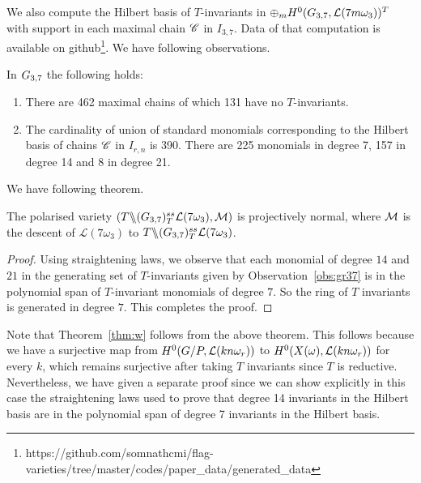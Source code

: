 We also compute the Hilbert basis of $T$-invariants in $\oplus_m H^0(G_{{3},{7}}, {\cal L}(7m\omega_3))^T$ with support in each maximal chain $\mathscr{C}$ in $I_{3,7}$.
Data of that computation is available on github\footnote{https://github.com/somnathcmi/flag-varieties/tree/master/codes/paper\_data/generated\_data}. We have following observations. 
\begin{observation}
\label{obs:gr37}
In $G_{{3},{7}}$ the following holds:
\begin{enumerate}
\item There are 462 maximal chains of which 131 have no $T$-invariants.
\item The cardinality of union of standard monomials corresponding to the Hilbert basis of chains $\mathscr{C}$ in $I_{r,n}$ is 390. There are 225 monomials in degree 7, 157 in degree 14 and 8 in degree 21.
\end{enumerate}
\end{observation}
  We have following theorem. 
\begin{theorem}
    The polarised variety \((T \backslash\mkern-6mu\backslash (G_{{3},{7}})^{ss}_T{\cal L}(7\omega_3),{\cal M})\) is projectively normal, where \(\cal M\) is the descent of \({\mathcal L}(7\omega_3)\) to \(T \backslash\mkern-6mu\backslash (G_{{3},{7}})^{ss}_T{\cal L}(7\omega_3)\).
\end{theorem}
\begin{proof}
Using straightening laws, we observe that each monomial of degree \(14\) and \(21\) in the generating set of $T$-invariants given by Observation~\ref{obs:gr37} is in the polynomial span of  $T$-invariant monomials  of degree \(7\). So the ring of $T$ invariants is generated in degree $7$. This completes the proof.
\end{proof}

Note that Theorem~\ref{thm:w} follows from the above theorem. This follows because we have a surjective map from $H^0(G/P, {\cal L}(kn\omega_r))$ to 
$H^0(X(\omega), {\cal L}(kn\omega_r))$ for every $k$, which remains surjective after taking $T$ invariants since $T$ is reductive. Nevertheless, we have given a separate proof since 
we can show explicitly in this case the straightening laws used to prove that degree 14 invariants in the Hilbert basis are in the polynomial span of degree 7 invariants in the Hilbert basis.
 
